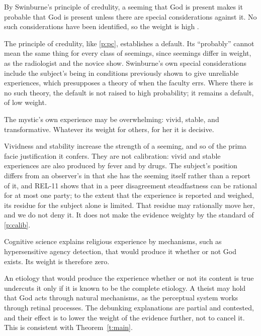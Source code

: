 \documentclass{situationist-preprint}
\begin{document}
\begin{objection}[Credulity]
By Swinburne's principle of credulity, a seeming that God is present makes it probable that God is present unless there are special considerations against it. No such considerations have been identified, so the weight is high \citep{Swinburne1979}.
\end{objection}

\begin{reply}
The principle of credulity, like \ref{p:pc}, establishes a default. Its \enquote{probably} cannot mean the same thing for every class of seemings, since seemings differ in weight, as the radiologist and the novice show. Swinburne's own special considerations include the subject's being in conditions previously shown to give unreliable experiences, which presupposes a theory of when the faculty errs. Where there is no such theory, the default is not raised to high probability; it remains a default, of low weight.
\end{reply}

\begin{objection}
The mystic's own experience may be overwhelming: vivid, stable, and transformative. Whatever its weight for others, for her it is decisive.
\end{objection}

\begin{reply}
Vividness and stability increase the strength of a seeming, and so of the prima facie justification it confers. They are not calibration: vivid and stable experiences are also produced by fever and by drugs. The subject's position differs from an observer's in that she has the seeming itself rather than a report of it, and REL-11 shows that in a peer disagreement steadfastness can be rational for at most one party; to the extent that the experience is reported and weighed, its residue for the subject alone is limited. That residue may rationally move her, and we do not deny it. It does not make the evidence weighty by the standard of \ref{p:calib}.
\end{reply}

\begin{objection}[Debunking]
Cognitive science explains religious experience by mechanisms, such as hypersensitive agency detection, that would produce it whether or not God exists. Its weight is therefore zero.
\end{objection}

\begin{reply}
An etiology that would produce the experience whether or not its content is true undercuts it only if it is known to be the complete etiology. A theist may hold that God acts through natural mechanisms, as the perceptual system works through retinal processes. The debunking explanations are partial and contested, and their effect is to lower the weight of the evidence further, not to cancel it. This is consistent with Theorem~\ref{t:main}.
\end{reply}
\end{document}
